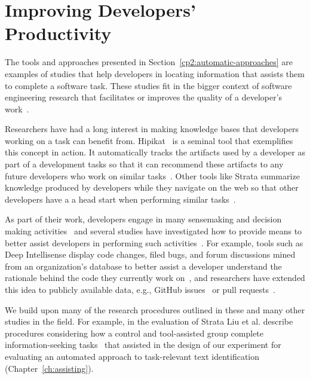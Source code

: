 



\section{Improving Developers' Productivity}
\label{cp2:dev-productivity}



The tools and approaches presented in Section~\ref{cp2:automatic-approaches}
are examples of studies that help developers in locating 
information that assists them to complete a software task.
These studies fit in the bigger context 
of software engineering research 
that facilitates or improves the quality of a developer's work~\cite{Kersten2006, Meyer2017, satterfield2020}. 



Researchers have had a long interest in 
making knowledge bases
that developers working on a task can benefit from. 
Hipikat~\cite{Cubranic2005} is a seminal tool that exemplifies this concept in action.
It automatically tracks the artifacts 
used by a developer as part of a development tasks 
so that it can recommend these artifacts to 
any future developers who work on similar tasks~\cite{Cubranic2005}.
Other tools like Strata summarize knowledge produced by developers 
while they navigate on the web so that other developers have a 
a head start when performing similar tasks~\cite{liu2021}.



As part of their work, developers engage in many sensemaking and decision making activities~\cite{sillito2006} and several studies have investigated how to 
provide means to better  
assist developers in performing such activities~\cite{Liu2018Unakite, liu2021, barnett2015}.
For example, tools such as Deep Intellisense 
display code changes, filed bugs, and forum discussions 
mined from an organization's database to better assist a developer
understand 
the rationale behind the code they currently work on~\cite{Holmes2008},
and researchers have extended this idea to  
publicly available data, e.g., GitHub issues~\cite{Viviani2019}
or pull requests~\cite{freire2021}. 



We build upon many of the research procedures outlined 
in these and many other studies in the field. 
For example, in the evaluation of Strata 
 Liu et al. describe procedures 
considering how a control and tool-assisted group 
complete information-seeking tasks~\cite{liu2021}
that assisted in the design of our experiment for 
evaluating an automated approach to
task-relevant text identification (Chapter~\ref{ch:assisting}).



